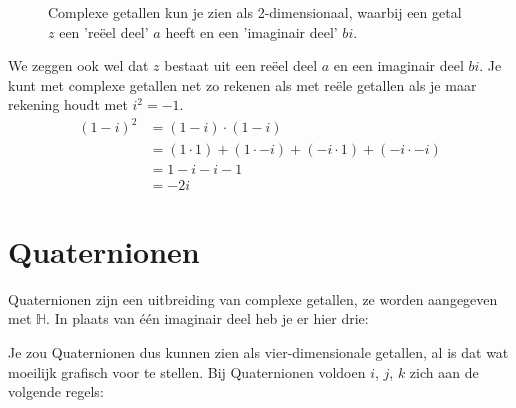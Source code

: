 \begin{figure}[h!]
    \centering
    
    \caption{Complexe getallen kun je zien als 2-dimensionaal, waarbij een getal $z$ een 'reëel deel' $a$ heeft en een 'imaginair deel' $bi$.}
    \label{fig:lijncomplex}
\end{figure}

We zeggen ook wel dat $z$ bestaat uit een reëel deel $a$ en een imaginair deel $bi$. Je kunt met complexe getallen net zo rekenen als met reële getallen als je maar rekening houdt met $i^2 = -1$.
\begin{align*}
    (1-i)^2 &= (1-i)\cdot (1-i) \\
            &= (1\cdot 1) + (1\cdot -i) + (-i \cdot 1) + (-i\cdot -i) \\
            &= 1 - i - i -1 \\
            &= -2i 
\end{align*}

\section{Quaternionen}
Quaternionen zijn een uitbreiding van complexe getallen, ze worden aangegeven met $\mathbb{H}$. In plaats van één imaginair deel heb je er hier drie:

Je zou Quaternionen dus kunnen zien als vier-dimensionale getallen, al is dat wat moeilijk grafisch voor te stellen. Bij Quaternionen voldoen $i$, $j$, $k$ zich aan de volgende regels:
\setlength{\abovedisplayskip}{-15pt}
\setlength{\belowdisplayskip}{-5pt}

